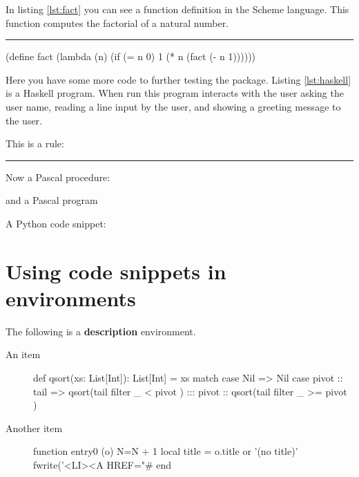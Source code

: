 \documentclass[10pt,a4paper]{article}
\begin{document}
In listing \ref{lst:fact} you can see a function definition in the
Scheme language. This function computes the factorial of a natural
number.
\newline\rule{\linewidth}{2pt}
\begin{pygmented}[
  sty=emacs,
  linenos,
  label=lst:fact,
  caption=A Scheme function.
  ]
(define fact
    (lambda (n)
        (if (= n 0)
            1
            (* n (fact (- n 1))))))
\end{pygmented}

Here you have some more code to further testing the package. Listing
\ref{lst:haskell} is a Haskell program. When run this program interacts
with the user asking the user name, reading a line input by the user,
and showing a greeting message to the user.


This is a rule:

\noindent\rule{\linewidth}{2pt}

Now a Pascal procedure:

and a Pascal program

A Python code snippet:


\section{Using code snippets in environments}

The following is a \textbf{description} environment.

\begin{description}
  \item[An item] \lipsum[31]
  \begin{pygmented}[lang=scala,colback=yellow,
    ]
def qsort(xs: List[Int]): List[Int] =
  xs match {
    case Nil =>
      Nil
    case pivot :: tail =>
      qsort(tail filter { _ < pivot }) :::
        pivot :: qsort(tail filter { _ >= pivot })
  }
  \end{pygmented}
  \lipsum[32]
  
  \item[Another item] \lipsum[33]
  \begin{pygmented}[lang=lua,colback=yellow]
function entry0 (o)
  N=N + 1
  local title = o.title or '(no title)'
  fwrite('<LI><A HREF="#%
end
  \end{pygmented}
  \lipsum[34]
\end{description}
\end{document}
